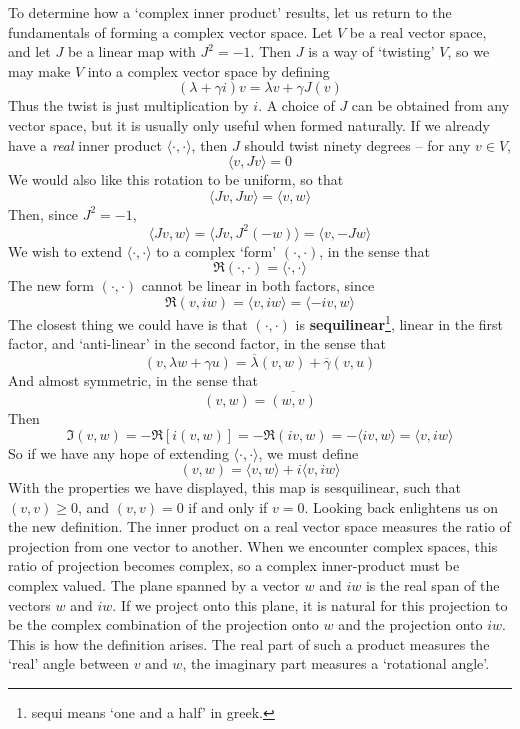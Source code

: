 To determine how a `complex inner product' results, let us return to the fundamentals of forming a complex vector space. Let $V$ be a real vector space, and let $J$ be a linear map with $J^2 = -1$. Then $J$ is a way of `twisting' $V$, so we may make $V$ into a complex vector space by defining
%
\[ (\lambda + \gamma i) v = \lambda v + \gamma J(v) \]
%
Thus the twist is just multiplication by $i$. A choice of $J$ can be obtained from any vector space, but it is usually only useful when formed naturally. If we already have a {\it real} inner product $\langle \cdot, \cdot \rangle$, then $J$ should twist ninety degrees -- for any $v \in V$,
%
\[ \langle v, Jv \rangle = 0 \]
%
We would also like this rotation to be uniform, so that
%
\[ \langle Jv, Jw \rangle = \langle v, w \rangle \]
%
Then, since $J^2 = -1$,
%
\[ \langle Jv, w \rangle = \langle Jv, J^2(-w) \rangle = \langle v, -Jw \rangle \]
%
We wish to extend $\langle \cdot, \cdot \rangle$ to a complex `form' $(\cdot, \cdot)$, in the sense that
%
\[ \Re (\cdot, \cdot) = \langle \cdot, \cdot \rangle \]
%
The new form $(\cdot, \cdot)$ cannot be linear in both factors, since
%
\[ \Re (v, iw) = \langle v, iw \rangle = \langle -iv, w \rangle \]
%
The closest thing we could have is that $(\cdot, \cdot)$ is {\bf sequilinear}\footnote{sequi means `one and a half' in greek.}, linear in the first factor, and `anti-linear' in the second factor, in the sense that
%
\[ (v, \lambda w + \gamma u) = \overline{\lambda} (v,w) + \overline{\gamma} (v,u) \]
%
And almost symmetric, in the sense that
%
\[ (v,w) = \overline{(w,v)} \]
%
Then
%
\[ \Im (v,w) = - \Re [i (v, w)] = - \Re (iv, w) = - \langle iv, w \rangle = \langle v, i w \rangle \]
%
So if we have any hope of extending $\langle \cdot, \cdot \rangle$, we must define
%
\[ (v,w) = \langle v, w \rangle + i \langle v, iw \rangle \]
%
With the properties we have displayed, this map is sesquilinear, such that $(v,v) \geq 0$, and $(v,v) = 0$ if and only if $v = 0$. Looking back enlightens us on the new definition. The inner product on a real vector space measures the ratio of projection from one vector to another. When we encounter complex spaces, this ratio of projection becomes complex, so a complex inner-product must be complex valued. The plane spanned by a vector $w$ and $iw$ is the real span of the vectors $w$ and $iw$. If we project onto this plane, it is natural for this projection to be the complex combination of the projection onto $w$ and the projection onto $iw$. This is how the definition arises. The real part of such a product measures the `real' angle between $v$ and $w$, the imaginary part measures a `rotational angle'.

